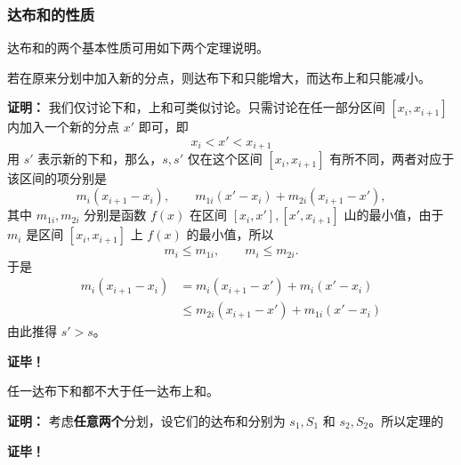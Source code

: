 \subsubsection{达布和的性质}
达布和的两个基本性质可用如下两个定理说明。
\begin{theorem}{}
若在原来分划中加入新的分点，则达布下和只能增大，而达布上和只能减小。
\end{theorem}
\textbf{证明：}
我们仅讨论下和，上和可类似讨论。只需讨论在任一部分区间 $[x_i,x_{i+1}]$ 内加入一个新的分点 $x'$ 即可，即
\begin{equation}
x_i<x'<x_{i+1}
\end{equation}
用 $s'$ 表示新的下和，那么，$s,s'$ 仅在这个区间  $[x_i,x_{i+1}]$ 有所不同，两者对应于该区间的项分别是
\begin{equation}
m_i(x_{i+1}-x_i),\qquad m_{1i}(x'-x_i)+m_{2i}(x_{i+1}-x'),
\end{equation}
其中 $m_{1i},m_{2i}$ 分别是函数 $f(x)$ 在区间 $[x_i,x'],[x',x_{i+1}]$ 山的最小值，由于 $m_i$ 是区间 $[x_i,x_{i+1}]$ 上 $f(x)$ 的最小值，所以
\begin{equation}
m_i\leq m_{1i},\qquad m_i\leq m_{2i}.
\end{equation}
于是
\begin{equation}
\begin{aligned}
m_i(x_{i+1}-x_i)&=m_i(x_{i+1}-x')+m_i(x'-x_i)\\
&\leq m_{2i}(x_{i+1}-x')+m_{1i}(x'-x_i)
\end{aligned}
\end{equation}
由此推得 $s'>s$。

\textbf{证毕！}
\begin{theorem}{}
任一达布下和都不大于任一达布上和。
\end{theorem}
\textbf{证明：}
考虑\textbf{任意两个}分划，设它们的达布和分别为 $s_1,S_1$ 和 $s_2,S_2$。所以定理的

\textbf{证毕！}


